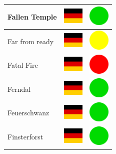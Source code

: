 \documentclass[12pt, a4paper, twoside]{report}
\begin{document}
\begin{center}
\begin{longtable}{|p{5cm}|p{2cm}|p{2cm}|}
Fallen Temple & \includegraphics[width=1cm]{4x3/de} & \includegraphics[width=1cm]{likes/y} \\ \hline
Far from ready & \includegraphics[width=1cm]{4x3/de} & \includegraphics[width=1cm]{likes/m} \\ \hline
Fatal Fire & \includegraphics[width=1cm]{4x3/de} & \includegraphics[width=1cm]{likes/n} \\ \hline
Ferndal & \includegraphics[width=1cm]{4x3/de} & \includegraphics[width=1cm]{likes/y} \\ \hline
Feuerschwanz & \includegraphics[width=1cm]{4x3/de} & \includegraphics[width=1cm]{likes/y} \\ \hline
Finsterforst & \includegraphics[width=1cm]{4x3/de} & \includegraphics[width=1cm]{likes/y} \\ \hline

\end{longtable}
\end{center}
\end{document}

